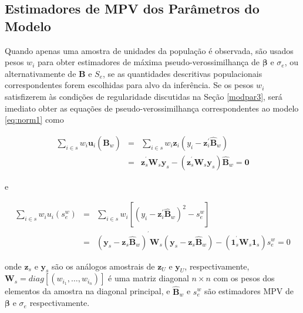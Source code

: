\documentclass[]{book}
\theoremstyle{definition}
\theoremstyle{definition}
\theoremstyle{definition}
\theoremstyle{remark}
\begin{document}
\subsection{Estimadores de MPV dos Parâmetros do
Modelo}\label{estimadores-de-mpv-dos-parametros-do-modelo}

Quando apenas uma amostra de unidades da população é observada, são
usados pesos \(w_{i}\) para obter estimadores de máxima
pseudo-verossimilhança de \(\mathbf{\beta }\) e \(\sigma _{e}\), ou
alternativamente de \(\mathbf{B}\) e \(S_{e}\), se as quantidades
descritivas populacionais correspondentes forem escolhidas para alvo da
inferência. Se os pesos \(w_{i}\) satisfizerem às condições de
regularidade discutidas na Seção \ref{modpar3}, será imediato obter as
equações de pseudo-verossimilhança correspondentes ao modelo
\eqref{eq:norm1} como

\begin{eqnarray}
\sum\limits_{i\in s}w_{i}\mathbf{u}_{i}\left( \mathbf{\hat{B}}_{w}\right)
&=&\sum\limits_{i\in s}w_{i}\mathbf{z}_{i}\left( y_{i}-\mathbf{z}
_{i}^{\prime }\mathbf{\hat{B}}_{w}\right)  \label{eq:norm12} \\
&=&\mathbf{z}_{s}^{^{\prime }}\mathbf{W}_{s}\mathbf{y}_{s}-\left( \mathbf{z}
_{s}^{^{\prime }}\mathbf{W}_{s}\mathbf{y}_{s}\right) \mathbf{\hat{B}}_{w}=
\mathbf{0}  \nonumber
\end{eqnarray}

e

\begin{eqnarray}
\sum\limits_{i\in s}w_{i}u_{i}\left( s_{e}^{w}\right) &=&\sum\limits_{i\in
s}w_{i}\left[ \left( y_{i}-\mathbf{z}_{i}^{\prime }\mathbf{\hat{B}}
_{w}\right) ^{2}-s_{e}^{w}\right]  \label{eq:norm13} \\
&=&\left( \mathbf{y}_{s}-\mathbf{z}_{s}\mathbf{\hat{B}}_{w}\right)
^{^{\prime }}\mathbf{W}_{s}\left( \mathbf{y}_{s}-\mathbf{z}_{s}\mathbf{\hat{B
}}_{w}\right) -\left( \mathbf{1}_{s}^{^{\prime }}\mathbf{W}_{s}\mathbf{1}
_{s}\right) s_{e}^{w}=0  \nonumber
\end{eqnarray}

onde \(\mathbf{z}_{s}\) e \(\mathbf{y}_{s}\) são os análogos amostrais
de \(\mathbf{z}_{U}\) e \(\mathbf{y}_{U}\), respectivamente,
\(\mathbf{W}_{s}=diag\left[ \left( w_{i_{1}},\ldots ,w_{i_{n}}\right) \right]\)
é uma matriz diagonal \(n\times n\) com os pesos dos elementos da
amostra na diagonal principal, e \(\mathbf{\hat{B}}_{w}\) e
\(s_{e}^{w}\) são estimadores MPV de \(\mathbf{\beta }\) e
\(\sigma _{e}\) respectivamente.
\end{document}
